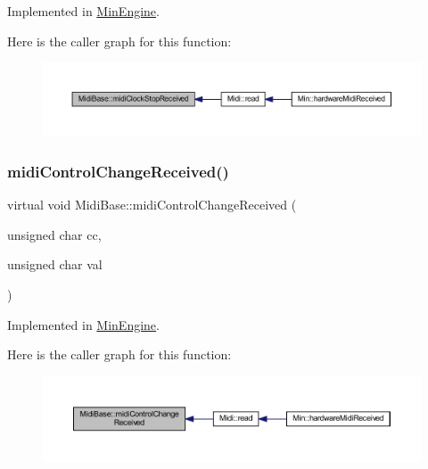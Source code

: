 Implemented in \hyperlink{class_min_engine_a08ac0328006e01f44ffbb3c78f4f504a}{Min\+Engine}.

Here is the caller graph for this function\+:
\nopagebreak
\begin{figure}[H]
\begin{center}
\leavevmode
\includegraphics[width=350pt]{de/def/class_midi_base_ab9a5c65ebffdfc31e118fef9e4dd04bb_icgraph}
\end{center}
\end{figure}
\mbox{\label{class_midi_base_a8364d72d525fd8a766a124ca3230a4c7}} 
\subsubsection{\texorpdfstring{midi\+Control\+Change\+Received()}{midiControlChangeReceived()}}
{\footnotesize\ttfamily virtual void Midi\+Base\+::midi\+Control\+Change\+Received (\begin{DoxyParamCaption}\item[{unsigned char}]{cc,  }\item[{unsigned char}]{val }\end{DoxyParamCaption})\hspace{0.3cm}{\ttfamily [pure virtual]}}



Implemented in \hyperlink{class_min_engine_ad7404def0db3926e77c8828cab13cca9}{Min\+Engine}.

Here is the caller graph for this function\+:
\nopagebreak
\begin{figure}[H]
\begin{center}
\leavevmode
\includegraphics[width=350pt]{de/def/class_midi_base_a8364d72d525fd8a766a124ca3230a4c7_icgraph}
\end{center}
\end{figure}
\mbox{\label{class_midi_base_aa26f04b4ead215bce201e480faf7c914}} 
